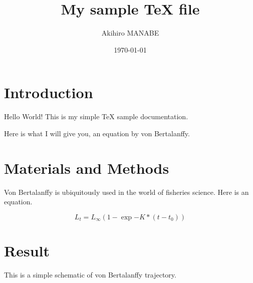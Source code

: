 \documentclass[a4j,12pt]{jreport}
\title{My sample TeX file}
\author{Akihiro MANABE}
\date{\today}
\begin{document}
\maketitle

\section{Introduction}
Hello World! This is my simple TeX sample documentation.

Here is what I will give you, an equation by von Bertalanffy.

\section{Materials and Methods}

Von Bertalanffy is ubiquitously used in the world of fisheries science. Here is an equation.

\begin{equation}
L_t = L_\infty (1-\exp{-K * (t-t_0)})
\end{equation}

\section{Result}

This is a simple schematic of von Bertalanffy trajectory.

\end{document}

